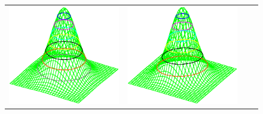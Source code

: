 \begin{figure}
\begin{tabular}{*{4}{c}}
  \includegraphics[width=\tw/4-15mm, height=\tw/4-15mm, clip=true]{../common/normxy_00.eps} &
  \includegraphics[width=\tw/4-15mm, height=\tw/4-15mm, clip=true]{../common/normxy_50.eps} &

\end{tabular}
\end{figure}
